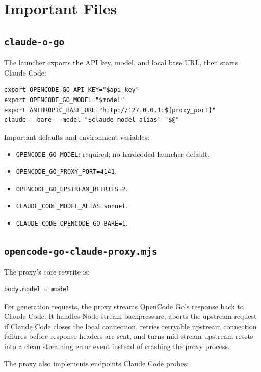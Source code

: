 \documentclass[11pt,a4paper]{article}
\newcommand{\code}[1]{\texttt{#1}}
\begin{document}
\section{Important Files}

\subsection{\code{claude-o-go}}

The launcher exports the API key, model, and local base URL, then starts
Claude Code:

\begin{verbatim}
export OPENCODE_GO_API_KEY="$api_key"
export OPENCODE_GO_MODEL="$model"
export ANTHROPIC_BASE_URL="http://127.0.0.1:${proxy_port}"
claude --bare --model "$claude_model_alias" "$@"
\end{verbatim}

Important defaults and environment variables:

\begin{itemize}
  \item \code{OPENCODE\_GO\_MODEL}: required; no hardcoded launcher default.
  \item \code{OPENCODE\_GO\_PROXY\_PORT=4141}.
  \item \code{OPENCODE\_GO\_UPSTREAM\_RETRIES=2}.
  \item \code{CLAUDE\_CODE\_MODEL\_ALIAS=sonnet}.
  \item \code{CLAUDE\_CODE\_OPENCODE\_GO\_BARE=1}.
\end{itemize}

\subsection{\code{opencode-go-claude-proxy.mjs}}

The proxy's core rewrite is:

\begin{verbatim}
body.model = model
\end{verbatim}

For generation requests, the proxy streams OpenCode Go's response back to
Claude Code. It handles Node stream backpressure, aborts the upstream request
if Claude Code closes the local connection, retries retryable upstream
connection failures before response headers are sent, and turns mid-stream
upstream resets into a clean streaming error event instead of crashing the
proxy process.

The proxy also implements endpoints Claude Code probes:
\end{document}
